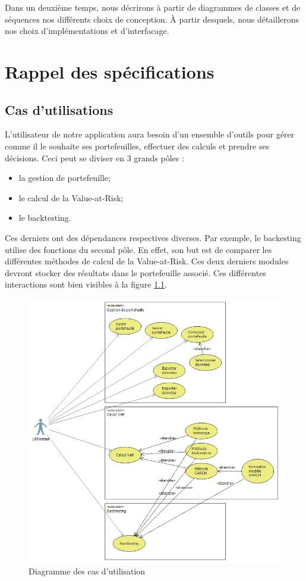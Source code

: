 \documentclass[a4paper,titlepage,french]{report}
\begin{document}
Dans un deuxième temps, nous décrirons à partir de diagrammes de classes et de séquences nos différents choix de conception.
\`A partir desquels, nous détaillerons nos choix d'implémentations et d'interfacage.


\chapter{Rappel des spécifications}

\section{Cas d'utilisations}

L'utilisateur de notre application aura besoin d'un ensemble d'outils pour gérer comme il le souhaite ses portefeuilles, effectuer des calculs et prendre ses décisions. Ceci peut se diviser en 3 grands pôles :
\begin{itemize}
\item la gestion de portefeuille;
\item le calcul de la Value-at-Risk;
\item le backtesting.
\end{itemize}
 
Ces derniers ont des dépendances respectives diverses. Par exemple, le backesting utilise des fonctions du second pôle.
En effet, son but est de comparer les différentes méthodes de calcul de la Value-at-Risk.
Ces deux derniers modules devront stocker des résultats dans le portefeuille associé.
Ces différentes interactions sont bien visibles à la figure \ref{fig:usecase}.

\begin{figure}[h]
 	\center
  	\includegraphics[scale=0.8]{UseCaseConception.png}
  	\caption{Diagramme des cas d'utilisation}
	\label{fig:usecase}
\end{figure}
\end{document}

